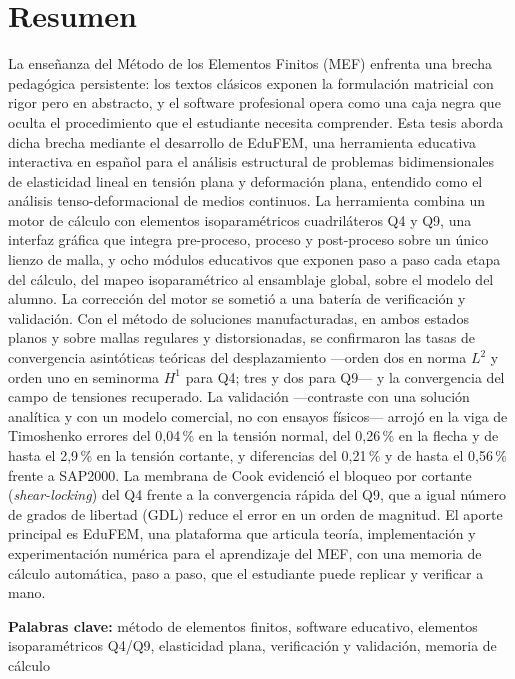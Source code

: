 \chapter*{Resumen}

La enseñanza del Método de los Elementos Finitos (MEF) enfrenta una brecha pedagógica persistente: los textos clásicos exponen la formulación matricial con rigor pero en abstracto, y el software profesional opera como una caja negra que oculta el procedimiento que el estudiante necesita comprender. Esta tesis aborda dicha brecha mediante el desarrollo de EduFEM, una herramienta educativa interactiva en español para el análisis estructural de problemas bidimensionales de elasticidad lineal en tensión plana y deformación plana, entendido como el análisis tenso-deformacional de medios continuos. La herramienta combina un motor de cálculo con elementos isoparamétricos cuadriláteros Q4 y Q9, una interfaz gráfica que integra pre-proceso, proceso y post-proceso sobre un único lienzo de malla, y ocho módulos educativos que exponen paso a paso cada etapa del cálculo, del mapeo isoparamétrico al ensamblaje global, sobre el modelo del alumno. La corrección del motor se sometió a una batería de verificación y validación. Con el método de soluciones manufacturadas, en ambos estados planos y sobre mallas regulares y distorsionadas, se confirmaron las tasas de convergencia asintóticas teóricas del desplazamiento —orden dos en norma $L^2$ y orden uno en seminorma $H^1$ para Q4; tres y dos para Q9— y la convergencia del campo de tensiones recuperado. La validación —contraste con una solución analítica y con un modelo comercial, no con ensayos físicos— arrojó en la viga de Timoshenko errores del 0,04\,\% en la tensión normal, del 0,26\,\% en la flecha y de hasta el 2,9\,\% en la tensión cortante, y diferencias del 0,21\,\% y de hasta el 0,56\,\% frente a SAP2000. La membrana de Cook evidenció el bloqueo por cortante (\emph{shear-locking}) del Q4 frente a la convergencia rápida del Q9, que a igual número de grados de libertad (GDL) reduce el error en un orden de magnitud. El aporte principal es EduFEM, una plataforma que articula teoría, implementación y experimentación numérica para el aprendizaje del MEF, con una memoria de cálculo automática, paso a paso, que el estudiante puede replicar y verificar a mano.

\noindent\textbf{Palabras clave:} método de elementos finitos, software educativo, elementos isoparamétricos Q4/Q9, elasticidad plana, verificación y validación, memoria de cálculo